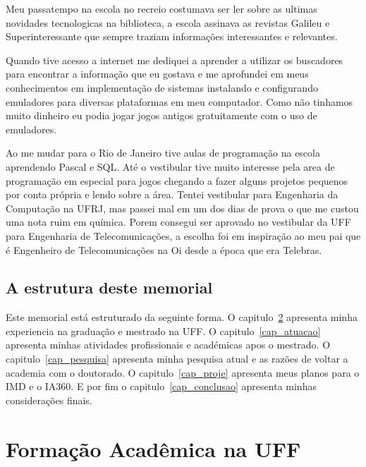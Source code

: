 \documentclass[10pt,a4paper,oneside]{book}
\begin{document}
Meu passatempo na escola no recreio costumava ser ler sobre as ultimas novidades
tecnologicas na biblioteca, a escola assinava as  revistas Galileu e Superinteressante que sempre traziam informações
interessantes e relevantes.

Quando tive acesso a internet me dediquei a aprender a utilizar os buscadores para encontrar 
a informação que eu gostava e me aprofundei em meus conhecimentos em implementação de sistemas
instalando e configurando emuladores para diversas plataformas em meu computador. Como não tinhamos
muito dinheiro eu podia jogar jogos antigos gratuitamente com o uso de emuladores.

Ao me mudar para o Rio de Janeiro tive aulas de programação na escola aprendendo Pascal e SQL. 
Até o vestibular tive muito interesse pela area de programação em especial para jogos chegando a 
fazer alguns projetos pequenos por conta própria e lendo sobre a área. Tentei vestibular para Engenharia da Computação
na UFRJ, mas passei mal em um dos dias de prova o que me custou uma nota ruim em química. Porem consegui ser aprovado
no vestibular da UFF para Engenharia de Telecomunicações, a escolha foi em inspiração ao meu pai que 
é Engenheiro de Telecomunicações na Oi desde a época que era Telebras.


\section{A estrutura deste memorial}

Este memorial está estruturado da seguinte forma. O capitulo~\ref{cap_uff} apresenta minha 
experiencia na graduação e mestrado na UFF. O capitulo~\ref{cap_atuacao} apresenta minhas atividades 
profissionais e académicas apos o mestrado. O capitulo~\ref{cap_pesquisa} apresenta minha pesquisa
atual e as razões de voltar a academia com o doutorado. O capitulo~\ref{cap_proje} apresenta
meus planos para o IMD e o IA360. E por fim o capitulo~\ref{cap_conclusao} apresenta minhas 
considerações finais.


\chapter{Formação Acadêmica na UFF}
\label{cap_uff}
\end{document}
